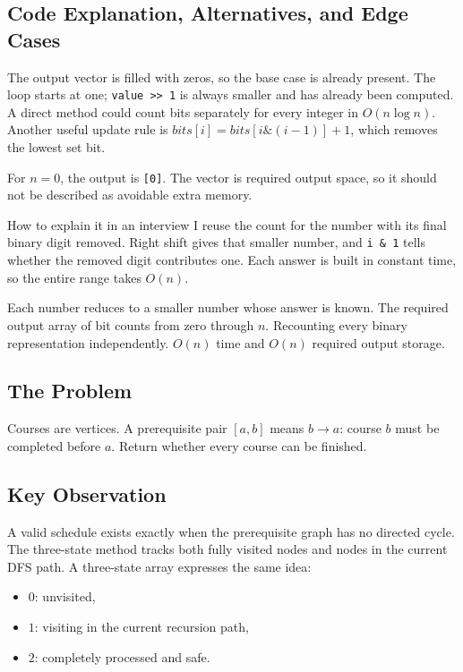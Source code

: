 \subsection{Code Explanation, Alternatives, and Edge Cases}
The output vector is filled with zeros, so the base case is already
present. The loop starts at one; \texttt{value >> 1} is always smaller and
has already been computed. A direct method could count bits separately for
every integer in \(O(n\log n)\). Another useful update rule is
\(bits[i]=bits[i\&(i-1)]+1\), which removes the lowest set bit.

For \(n=0\), the output is \texttt{[0]}. The vector is required output space,
so it should not be described as avoidable extra memory.

\begin{revisionbox}{How to explain it in an interview}
I reuse the count for the number with its final binary digit removed. Right
shift gives that smaller number, and \texttt{i \& 1} tells whether the removed
digit contributes one. Each answer is built in constant time, so the entire
range takes \(O(n)\).
\end{revisionbox}
\chaptercheckpoint
  {Each number reduces to a smaller number whose answer is known.}
  {The required output array of bit counts from zero through $n$.}
  {Recounting every binary representation independently.}
  {$O(n)$ time and $O(n)$ required output storage.}
\judgeclassnote



\subsection{The Problem}
Courses are vertices. A prerequisite pair \([a,b]\) means \(b\rightarrow a\):
course \(b\) must be completed before \(a\). Return whether every course can
be finished.

\subsection{Key Observation}
A valid schedule exists exactly when the prerequisite graph has no directed
cycle. The three-state method tracks both fully visited nodes and nodes in the current DFS
path. A three-state array expresses the same idea:
\begin{itemize}
  \item \(0\): unvisited,
  \item \(1\): visiting in the current recursion path,
  \item \(2\): completely processed and safe.
\end{itemize}

